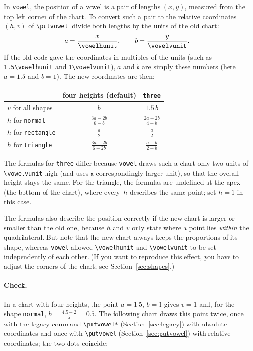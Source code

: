\documentclass[a4paper,11pt]{article}
\newcommand\cmd[1]{\texttt{\textbackslash #1}}
\newcommand\opt[1]{\texttt{#1}}
\newcommand\pkg[1]{\texttt{#1}}
\begin{document}
In \pkg{vowel}, the position of a vowel is a pair of lengths $(x,y)$, measured from the top left corner of the chart. To convert such a pair to the relative coordinates $(h,v)$ of \cmd{putvowel}, divide both lengths by the units of the old chart:
\[
a=\frac{x}{\text{\cmd{vowelhunit}}},\qquad b=\frac{y}{\text{\cmd{vowelvunit}}} .
\]
If the old code gave the coordinates in multiples of the units (such as \texttt{1.5\textbackslash vowelhunit} and \texttt{1\textbackslash vowelvunit}), $a$ and $b$ are simply these numbers (here $a=1.5$ and $b=1$). The new coordinates are then:

\begin{center}
	\begin{tabular}{@{}lcc@{}}
		\toprule
		& four heights (default) & \opt{three}\\
		\midrule
		$v$ for all shapes & $b$ & $1.5\,b$\\[6pt]
		$h$ for \opt{normal} & $\displaystyle\frac{3a-2b}{6-b}$ & $\displaystyle\frac{2a-2b}{4-b}$\\[8pt]
		$h$ for \opt{rectangle} & $\displaystyle\frac{a}{2}$ & $\displaystyle\frac{a}{2}$\\[8pt]
		$h$ for \opt{triangle} & $\displaystyle\frac{3a-2b}{6-2b}$ & $\displaystyle\frac{a-b}{2-b}$\\
		\bottomrule
	\end{tabular}
\end{center}

\noindent
The formulas for \opt{three} differ because \pkg{vowel} draws such a chart only two units of \cmd{vowelvunit} high (and uses a correspondingly larger unit), so that the overall height stays the same. For the triangle, the formulas are undefined at the apex (the bottom of the chart), where every~$h$ describes the same point; set $h=1$ in this case.

The formulas also describe the position correctly if the new chart is larger or smaller than the old one, because $h$ and $v$ only state where a point lies \emph{within} the quadrilateral. But note that the new chart always keeps the proportions of its shape, whereas \pkg{vowel} allowed \cmd{vowelhunit} and \cmd{vowelvunit} to be set independently of each other.
(If you want to reproduce this effect, you have to adjust the corners of the chart; see Section~\ref{sec:shapes}.)

\paragraph{Check.}
In a chart with four heights, the point $a=1.5$, $b=1$ gives $v=1$ and, for the shape \opt{normal}, $h=\frac{4.5-2}{5}=0.5$. The following chart draws this point twice, once with the legacy command \cmd{putvowel*} (Section~\ref{sec:legacy}) with absolute coordinates and once with \cmd{putvowel} (Section~\ref{sec:putvowel}) with relative coordinates; the two dots coincide:
\end{document}
